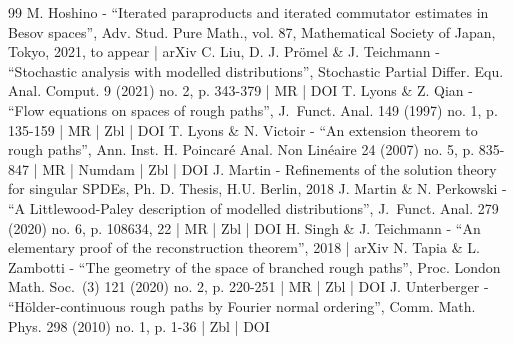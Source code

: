 \begin{thebibliography}{99}
M. Hoshino - “Iterated paraproducts and iterated commutator estimates in Besov spaces”, Adv. Stud. Pure Math., vol. 87, Mathematical Society of Japan, Tokyo, 2021, to appear | arXiv
C. Liu, D. J. Prömel \& J. Teichmann - “Stochastic analysis with modelled distributions”, Stochastic Partial Differ. Equ. Anal. Comput. 9 (2021) no. 2, p. 343-379 | MR | DOI
T. Lyons \& Z. Qian - “Flow equations on spaces of rough paths”, J. Funct. Anal. 149 (1997) no. 1, p. 135-159 | MR | Zbl | DOI
T. Lyons \& N. Victoir - “An extension theorem to rough paths”, Ann. Inst. H. Poincaré Anal. Non Linéaire 24 (2007) no. 5, p. 835-847 | MR | Numdam | Zbl | DOI
J. Martin - Refinements of the solution theory for singular SPDEs, Ph. D. Thesis, H.U. Berlin, 2018
J. Martin \& N. Perkowski - “A Littlewood-Paley description of modelled distributions”, J. Funct. Anal. 279 (2020) no. 6, p. 108634, 22 | MR | Zbl | DOI
H. Singh \& J. Teichmann - “An elementary proof of the reconstruction theorem”, 2018 | arXiv
N. Tapia \& L. Zambotti - “The geometry of the space of branched rough paths”, Proc. London Math. Soc. (3) 121 (2020) no. 2, p. 220-251 | MR | Zbl | DOI
J. Unterberger - “Hölder-continuous rough paths by Fourier normal ordering”, Comm. Math. Phys. 298 (2010) no. 1, p. 1-36 | Zbl | DOI
\end{thebibliography}
